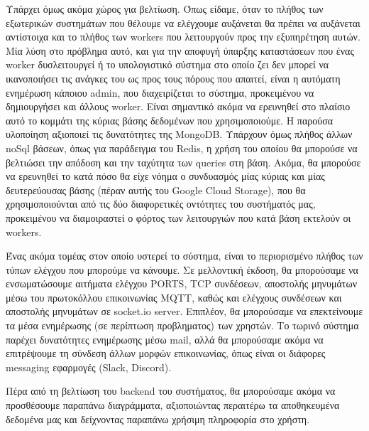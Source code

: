Υπάρχει όμως ακόμα χώρος για βελτίωση. Όπως είδαμε, όταν το πλήθος των εξωτερικών συστημάτων που θέλουμε να ελέγχουμε
αυξάνεται θα πρέπει να αυξάνεται αντίστοιχα και το πλήθος των workers που λειτουργούν προς την εξυπηρέτηση αυτών. Μία λύση στο πρόβλημα αυτό, και για
την αποφυγή ύπαρξης καταστάσεων που ένας worker δυσλειτουργεί ή το υπολογιστικό σύστημα στο οποίο ζει δεν μπορεί να ικανοποιήσει
τις ανάγκες του ως προς τους πόρους που απαιτεί, είναι η αυτόματη ενημέρωση κάποιου admin, που διαχειρίζεται το σύστημα,
προκειμένου να δημιουργήσει και άλλους worker. Είναι σημαντικό ακόμα να ερευνηθεί στο πλαίσιο αυτό το κομμάτι της κύριας βάσης δεδομένων
που χρησιμοποιούμε. H παρούσα υλοποίηση αξιοποιεί τις δυνατότητες της MongoDB. Υπάρχουν όμως πλήθος άλλων
noSql βάσεων, όπως για παράδειγμα του Redis, η χρήση του οποίου θα μπορούσε να βελτιώσει την απόδοση και την ταχύτητα των
queries στη βάση. Ακόμα, θα μπορούσε να ερευνηθεί το κατά πόσο θα είχε νόημα ο συνδυασμός μίας κύριας και μίας δευτερεύουσας βάσης (πέραν αυτής του Google Cloud Storage),
που θα χρησιμοποιούνται από τις δύο διαφορετικές οντότητες του συστήματός μας, προκειμένου να διαμοιραστεί ο φόρτος των λειτουργιών που κατά βάση εκτελούν οι workers.

Ένας ακόμα τομέας στον οποίο υστερεί το σύστημα, είναι το περιορισμένο πλήθος των τύπων ελέγχου που μπορούμε
να κάνουμε. Σε μελλοντική έκδοση, θα μπορούσαμε να ενσωματώσουμε αιτήματα ελέγχου PORTS, TCP συνδέσεων, αποστολής μηνυμάτων μέσω του πρωτοκόλλου επικοινωνίας MQTT,
καθώς και ελέγχους συνδέσεων και αποστολής μηνυμάτων σε socket.io server. Επιπλέον, θα μπορούσαμε να επεκτείνουμε τα 
μέσα ενημέρωσης (σε περίπτωση προβληματος) των χρηστών. Το τωρινό σύστημα παρέχει δυνατότητες ενημέρωσης μέσω mail, αλλά θα μπορούσαμε ακόμα να επιτρέψουμε
τη σύνδεση άλλων μορφών επικοινωνίας, όπως είναι οι διάφορες messaging εφαρμογές (Slack, Discord). 

Πέρα από τη βελτίωση του backend του συστήματος, θα μπορούσαμε ακόμα να προσθέσουμε παραπάνω διαγράμματα,
αξιοποιώντας περαιτέρω τα αποθηκευμένα δεδομένα μας και δείχνοντας παραπάνω χρήσιμη πληροφορία στο χρήστη.